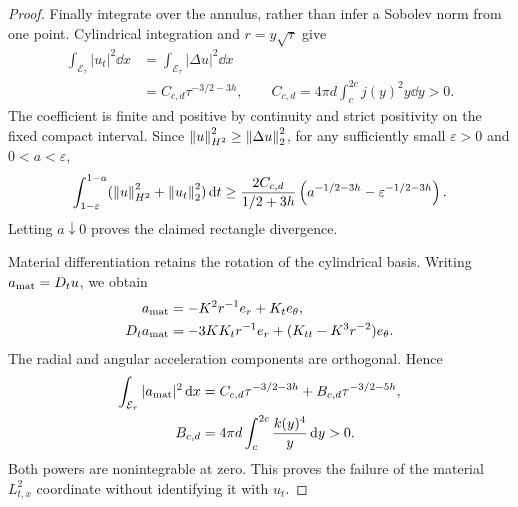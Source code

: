 \begin{proof}
Finally integrate over the annulus, rather than infer a Sobolev norm from
one point. Cylindrical integration and \(r=y\sqrt\tau\) give
\begin{equation}
 \begin{aligned}
 \int_{\mathcal E_\tau}|u_t|^2\dd x
 &=\int_{\mathcal E_\tau}|\Delta u|^2\dd x\\
 &=C_{c,d}\tau^{-3/2-3h},\qquad
 C_{c,d}=4\pi d\int_c^{2c}j(y)^2y\dd y>0.
 \end{aligned}
 \label{r:eq:exterior-integral}
\end{equation}
The coefficient is finite and positive by continuity and strict positivity
on the fixed compact interval. Since
\(\left\lVert u\right\rVert_{H^2}^2\ge\left\lVert \Delta u\right\rVert_2^2\), for any sufficiently small
\(\varepsilon>0\) and \(0<a<\varepsilon\),
\begin{equation}
 \int_{1-\varepsilon}^{1-a}
 (\left\lVert u\right\rVert_{H^2}^2+\left\lVert u_t\right\rVert_2^2)\,\mathrm d t
 \ge\frac{2C_{c,d}}{1/2+3h}
 \left(a^{-1/2-3h}-\varepsilon^{-1/2-3h}\right).
 \label{r:eq:rectangle-divergence}
\end{equation}
Letting \(a\downarrow0\) proves the claimed rectangle divergence.

Material differentiation retains the rotation of the cylindrical basis.
Writing \(a_{\rm mat}=D_tu\), we obtain
\begin{equation}
 \begin{aligned}
 a_{\rm mat}&=-K^2r^{-1}e_r+K_t e_\theta,\\
 D_ta_{\rm mat}
 &=-3KK_t r^{-1}e_r+(K_{tt}-K^3r^{-2})e_\theta .
 \end{aligned}
 \label{r:eq:exterior-material}
\end{equation}
The radial and angular acceleration components are orthogonal. Hence
\begin{equation}
 \begin{aligned}
 \int_{\mathcal E_\tau}|a_{\rm mat}|^2\,\mathrm d x
 &=C_{c,d}\tau^{-3/2-3h}
   +B_{c,d}\tau^{-3/2-5h},\\
 B_{c,d}&=4\pi d\int_c^{2c}\frac{k(y)^4}{y}\,\mathrm d y>0 .
 \end{aligned}
 \label{r:eq:exterior-material-integral}
\end{equation}
Both powers are nonintegrable at zero. This proves the failure of the
material \(L^2_{t,x}\) coordinate without identifying it with \(u_t\).


\end{proof}
